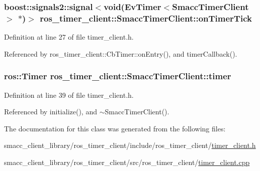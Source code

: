 \subsubsection[{\texorpdfstring{on\+Timer\+Tick}{onTimerTick}}]{\setlength{\rightskip}{0pt plus 5cm}boost\+::signals2\+::signal$<$void({\bf Ev\+Timer}$<${\bf Smacc\+Timer\+Client}$>$ $\ast$)$>$ ros\+\_\+timer\+\_\+client\+::\+Smacc\+Timer\+Client\+::on\+Timer\+Tick}\hypertarget{classros__timer__client_1_1SmaccTimerClient_aa9219b9e3278fcbd3f8fbe82bfc7a33f}{}\label{classros__timer__client_1_1SmaccTimerClient_aa9219b9e3278fcbd3f8fbe82bfc7a33f}


Definition at line 27 of file timer\+\_\+client.\+h.



Referenced by ros\+\_\+timer\+\_\+client\+::\+Cb\+Timer\+::on\+Entry(), and timer\+Callback().

\subsubsection[{\texorpdfstring{timer}{timer}}]{\setlength{\rightskip}{0pt plus 5cm}ros\+::\+Timer ros\+\_\+timer\+\_\+client\+::\+Smacc\+Timer\+Client\+::timer\hspace{0.3cm}{\ttfamily [protected]}}\hypertarget{classros__timer__client_1_1SmaccTimerClient_a950dfb5b2a2c699d2f260b1acda4fd93}{}\label{classros__timer__client_1_1SmaccTimerClient_a950dfb5b2a2c699d2f260b1acda4fd93}


Definition at line 39 of file timer\+\_\+client.\+h.



Referenced by initialize(), and $\sim$\+Smacc\+Timer\+Client().



The documentation for this class was generated from the following files\+:\begin{DoxyCompactItemize}
\item 
smacc\+\_\+client\+\_\+library/ros\+\_\+timer\+\_\+client/include/ros\+\_\+timer\+\_\+client/\hyperlink{timer__client_8h}{timer\+\_\+client.\+h}\item 
smacc\+\_\+client\+\_\+library/ros\+\_\+timer\+\_\+client/src/ros\+\_\+timer\+\_\+client/\hyperlink{timer__client_8cpp}{timer\+\_\+client.\+cpp}\end{DoxyCompactItemize}
